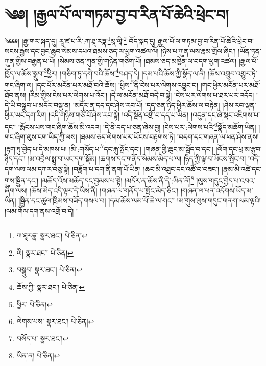 \setcounter{footnote}{0} 
\chapter{༄༅། །རྒྱལ་པོ་ལ་གཏམ་བྱ་བ་རིན་པོ་ཆེའི་ཕྲེང་བ།}༄༅༅། །རྒྱ་གར་སྐད་དུ། རཱ་ཛ་པ་རི་:ཀ་ཐཱ་རཏྣ་\footnote{ཀ་ཐཱརདྣ་  སྣར་ཐང་།  པེ་ཅིན། }མཱ་ལཱི།\footnote{ལི།  སྣར་ཐང་།  པེ་ཅིན། } བོད་སྐད་དུ། རྒྱལ་པོ་ལ་གཏམ་བྱ་བ་རིན་པོ་ཆེའི་ཕྲེང་བ། སངས་རྒྱས་དང་བྱང་ཆུབ་སེམས་དཔའ་ཐམས་ཅད་ལ་ཕྱག་འཚལ་ལོ། །ཉེས་པ་ཀུན་ལས་རྣམ་གྲོལ་ཞིང་། །ཡོན་ཏན་ཀུན་གྱིས་བརྒྱན་པ་པོ། །སེམས་ཅན་ཀུན་གྱི་གཉེན་གཅིག་པོ། །ཐམས་ཅད་མཁྱེན་ལ་བདག་ཕྱག་འཚལ། །རྒྱལ་པོ་ཁྱོད་ལ་ཆོས་སྒྲུབ་\footnote{བསྒྲུབ་  སྣར་ཐང་།  པེ་ཅིན། }ཕྱིར། །གཅིག་ཏུ་དགེ་བའི་ཆོས་\footnote{ཆོས་ཀྱི་  སྣར་ཐང་།  པེ་ཅིན། }བཤད་དེ། །དམ་པའི་ཆོས་ཀྱི་སྣོད་ལ་ནི། །ཆོས་འགྲུབ་འགྱུར་ཏེ་གང་ཞིག་ལ། །དང་པོར་མངོན་པར་མཐོ་བའི་ཆོས། །ཕྱིས་\footnote{ཕྱིར་  པེ་ཅིན། }ནི་ངེས་པར་ལེགས་འབྱུང་བ། །གང་ཕྱིར་མངོན་པར་མཐོ་ཐོབ་ནས། །རིམ་གྱིས་ངེས་པར་ལེགས་པ་འོང་། །དེ་ལ་མངོན་མཐོ་བདེ་བ་སྟེ། །ངེས་པར་ལེགས་པ་ཐར་པར་འདོད། །དེ་ཡི་བསྒྲུབ་པ་མདོར་བསྡུ་ན། །མདོར་ན་དད་དང་ཤེས་རབ་པོ། །དད་ཅན་ཉིད་ཕྱིར་ཆོས་ལ་བརྟེན། །ཤེས་རབ་ལྡན་ཕྱིར་ཡང་དག་རིག །འདི་གཉིས་གཙོ་བོ་ཤེས་རབ་སྟེ། །འདི་སྔོན་འགྲོ་བ་དད་པ་ཡིན། །འདུན་དང་ཞེ་སྡང་འཇིགས་པ་དང་། །རྨོངས་པས་གང་ཞིག་ཆོས་མི་འདའ། །དེ་ནི་དད་པ་ཅན་ཞེས་བྱ། །ངེས་པར་:ལེགས་པའི་\footnote{ལེགས་པས་  སྣར་ཐང་།  པེ་ཅིན། }སྣོད་མཆོག་ཡིན། །གང་ཞིག་ལུས་ངག་ཡིད་ཀྱི་ལས། །ཐམས་ཅད་ལེགས་པར་ཡོངས་བརྟགས་ཏེ། །བདག་དང་གཞན་ལ་ཕན་ཤེས་ནས། །རྟག་ཏུ་བྱེད་པ་དེ་མཁས་པ། །མི་:གསོད་པ་\footnote{བསོད་པ་  སྣར་ཐང་། }དང་རྐུ་སྤོང་དང་། །གཞན་གྱི་ཆུང་མ་སྦོད་བ་དང་། །ལོག་དང་ཕྲ་མ་རྩུབ་ཉིད་དང་། །མ་འབྲེལ་སྨྲ་བ་ཡང་དག་སྡོམ། །ཆགས་དང་གནོད་སེམས་མེད་པ་ལ། །ཉིད་ཀྱི་ལྟ་བ་ཡོངས་སྤོང་བ། །འདི་དག་ལས་ལམ་དཀར་བཅུ་སྟེ། །བཟློག་པ་དག་ནི་ནག་པོ་ཡིན། །ཆང་མི་འཐུང་དང་འཚོ་བ་བཟང་། །རྣམ་མི་འཚེ་དང་གུས་སྦྱིན་དང་། །མཆོད་འོས་མཆོད་དང་བྱམས་པ་སྟེ། །མདོར་ན་ཆོས་ནི་དེ་:ཡིན་ནོ།\footnote{ཡིན་ན།  པེ་ཅིན། } །ལུས་གདུང་བྱེད་པ་འབའ་ཞིག་ལས། །ཆོས་མེད་འདི་ལྟར་དེ་ཡིས་ནི། །གཞན་ལ་གནོད་པ་སྤོང་མེད་ཅིང་། །གཞན་ལ་ཕན་འདོགས་ཡོད་མ་ཡིན། །སྦྱིན་དང་ཚུལ་ཁྲིམས་བཟོད་གསལ་བ། །དམ་ཆོས་ལམ་པོ་ཆེ་ལ་གང་། །མ་གུས་ལུས་གདུང་གནག་ལམ་ལྟའི། །ལམ་གོལ་དག་ནས་འགྲོ་བ་དེ། །
